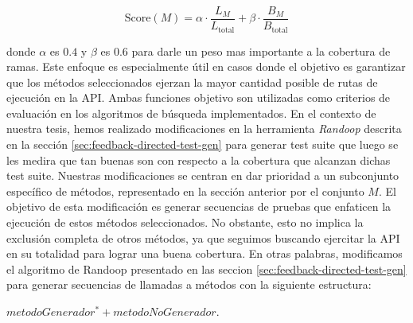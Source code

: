 \[
\text{Score}(M) = \alpha \cdot \frac{L_M}{L_{\text{total}}} + \beta \cdot \frac{B_M}{B_{\text{total}}}
\]

donde $\alpha$ es $0.4$ y $\beta$ es $0.6$ para darle un peso mas importante a la cobertura de ramas.
Este enfoque es especialmente útil en casos donde el objetivo es garantizar que los métodos seleccionados ejerzan la mayor cantidad posible de rutas de ejecución en la API.
Ambas funciones objetivo son utilizadas como criterios de evaluación en los algoritmos de búsqueda implementados. 
En el contexto de nuestra tesis, hemos realizado modificaciones en la herramienta \emph{Randoop} descrita en la sección \ref{sec:feedback-directed-test-gen} 
para generar test suite que luego se les medira que tan buenas son con respecto a la cobertura que alcanzan dichas test suite.
Nuestras modificaciones se centran en dar prioridad a un subconjunto específico de métodos, 
representado en la sección anterior por el conjunto $M$. 
El objetivo de esta modificación es generar secuencias de pruebas que enfaticen la ejecución de estos métodos seleccionados.
No obstante, esto no implica la exclusión completa de otros métodos, ya que seguimos buscando ejercitar la API en su totalidad para lograr una buena cobertura.
En otras palabras, modificamos el algoritmo de Randoop presentado en las seccion \ref{sec:feedback-directed-test-gen} para generar secuencias de llamadas a 
métodos con la siguiente estructura: 

\vspace{10pt} 
$metodoGenerador^* + metodoNoGenerador$. 


